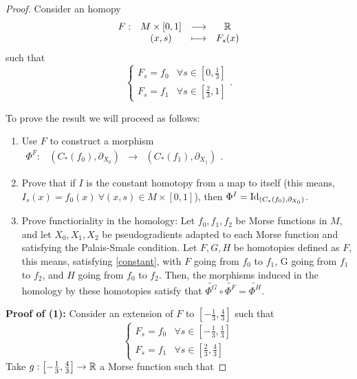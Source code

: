 \begin{proof}
Consider an homopy
\begin{displaymath}
\begin{array}{rccc} F : & M \times [0,1] & \longrightarrow & \mathbb{R} \\ & (x,s) & \longmapsto & F_s(x) \end{array}
\end{displaymath}
such that
\begin{equation} \label{constant}
\left\{ \begin{array}{lc} F_s = f_0 & \forall s \in \left[ 0, \frac13 \right] \\ F_s = f_1 & \forall s \in \left[ \frac23, 1 \right] \end{array} \right. .
\end{equation}

To prove the result we will proceed as follows:

\begin{enumerate}
	\item Use $F$ to construct a morphism $\begin{array}{rccc} \Phi^F : & (C_{\ast}(f_0),\partial_{X_0}) & \rightarrow & (C_{\ast}(f_1),\partial_{X_1}) \end{array}$.
	\item Prove that if $I$ is the constant homotopy from a map to itself (this means, $I_s(x) = f_0(x) \ \forall (x,s) \in M \times [0,1]$), then $\Phi^I = \mathrm{Id}_{(C_{\ast}(f_0),\partial_{X_0})}$.
	\item Prove functioriality in the homology: Let $f_0,f_1,f_2$ be Morse functions in $M$, and let $X_0,X_1,X_2$ be pseudogradients adapted to each Morse function and satisfying the Palais-Smale condition. Let $F, G, H$ be homotopies defined as $F$, this means, satisfying \ref{constant}, with $F$ going from $f_0$ to $f_1$, G going from $f_1$ to $f_2$, and $H$ going from $f_0$ to $f_2$. Then, the morphisms induced in the homology by these homotopies satisfy that $\widetilde{\Phi^G} \circ \widetilde{\Phi^F} = \widetilde{\Phi^H}$.
\end{enumerate}

{\bf Proof of (1):} Consider an extension of $F$ to $\left[ - \frac13 , \frac43 \right]$ such that
\begin{equation} \label{constant2}
\left\{ \begin{array}{lc} F_s = f_0 & \forall s \in \left[ - \frac13, \frac13 \right] \\ F_s = f_1 & \forall s \in \left[ \frac23, \frac43 \right] \end{array} \right.
\end{equation}
Take $g : \left[-\frac13,\frac43\right] \rightarrow \mathbb{R}$ a Morse function such that


\end{proof}
